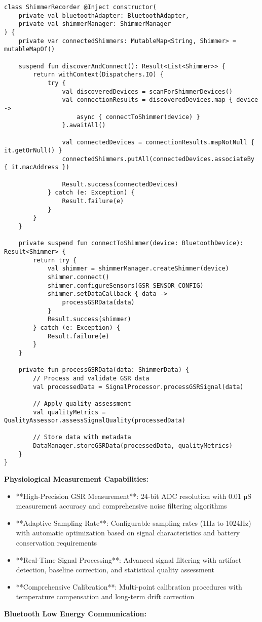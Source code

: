 \documentclass[12pt,a4paper]{article}
\begin{document}
\begin{verbatim}
class ShimmerRecorder @Inject constructor(
    private val bluetoothAdapter: BluetoothAdapter,
    private val shimmerManager: ShimmerManager
) {
    private var connectedShimmers: MutableMap<String, Shimmer> = mutableMapOf()
    
    suspend fun discoverAndConnect(): Result<List<Shimmer>> {
        return withContext(Dispatchers.IO) {
            try {
                val discoveredDevices = scanForShimmerDevices()
                val connectionResults = discoveredDevices.map { device ->
                    async { connectToShimmer(device) }
                }.awaitAll()
                
                val connectedDevices = connectionResults.mapNotNull { it.getOrNull() }
                connectedShimmers.putAll(connectedDevices.associateBy { it.macAddress })
                
                Result.success(connectedDevices)
            } catch (e: Exception) {
                Result.failure(e)
            }
        }
    }
    
    private suspend fun connectToShimmer(device: BluetoothDevice): Result<Shimmer> {
        return try {
            val shimmer = shimmerManager.createShimmer(device)
            shimmer.connect()
            shimmer.configureSensors(GSR_SENSOR_CONFIG)
            shimmer.setDataCallback { data ->
                processGSRData(data)
            }
            Result.success(shimmer)
        } catch (e: Exception) {
            Result.failure(e)
        }
    }
    
    private fun processGSRData(data: ShimmerData) {
        // Process and validate GSR data
        val processedData = SignalProcessor.processGSRSignal(data)
        
        // Apply quality assessment
        val qualityMetrics = QualityAssessor.assessSignalQuality(processedData)
        
        // Store data with metadata
        DataManager.storeGSRData(processedData, qualityMetrics)
    }
}
\end{verbatim}

\textbf{Physiological Measurement Capabilities:}

\begin{itemize}
\item **High-Precision GSR Measurement**: 24-bit ADC resolution with 0.01 µS measurement accuracy and comprehensive noise
  filtering algorithms
\item **Adaptive Sampling Rate**: Configurable sampling rates (1Hz to 1024Hz) with automatic optimization based on signal
  characteristics and battery conservation requirements
\item **Real-Time Signal Processing**: Advanced signal filtering with artifact detection, baseline correction, and
  statistical quality assessment
\item **Comprehensive Calibration**: Multi-point calibration procedures with temperature compensation and long-term drift
  correction

\end{itemize}
\textbf{Bluetooth Low Energy Communication:}
\end{document}
